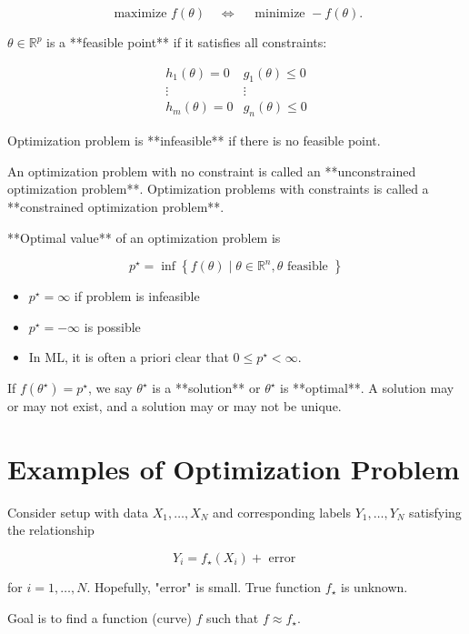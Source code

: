 \documentclass{report}
\begin{document}
$$
\text { maximize } f(\theta) \quad \Leftrightarrow \quad \text { minimize }-f(\theta).
$$

\begin{definition}
    $\theta \in \mathbb{R}^{p}$ is a **feasible point** if it satisfies all constraints:

    $$
    \begin{array}{cc}
    h_{1}(\theta)=0 & g_{1}(\theta) \leq 0 \\
    \vdots & \vdots \\
    h_{m}(\theta)=0 & g_{n}(\theta) \leq 0
    \end{array}
    $$

    Optimization problem is **infeasible** if there is no feasible point.

    An optimization problem with no constraint is called an **unconstrained optimization problem**. Optimization problems with constraints is called a **constrained optimization problem**.
\end{definition}

\begin{definition}
    **Optimal value** of an optimization problem is

    $$
    p^{\star}=\inf \left\{f(\theta) \mid \theta \in \mathbb{R}^{n}, \theta \text { feasible }\right\}
    $$

    \begin{itemize}
        \item $p^{\star}=\infty$ if problem is infeasible
        \item $p^{\star}=-\infty$ is possible
        \item In ML, it is often a priori clear that $0 \leq p^{\star}<\infty$.
    \end{itemize}

    If $f\left(\theta^{\star}\right)=p^{\star}$, we say $\theta^{\star}$ is a **solution** or $\theta^{\star}$ is **optimal**.  
    A solution may or may not exist, and a solution may or may not be unique.
\end{definition}

\section{Examples of Optimization Problem}

\begin{example}
    Consider setup with data $X_{1}, \ldots, X_{N}$ and corresponding labels $Y_{1}, \ldots, Y_{N}$ satisfying the relationship

    $$
    Y_{i}=f_{\star}\left(X_{i}\right)+\text { error }
    $$

    for $i=1, \ldots, N$. Hopefully, "error" is small. True function $f_{\star}$ is unknown.

    Goal is to find a function (curve) $f$ such that $f \approx f_{\star}$.
\end{example}
\end{document}
